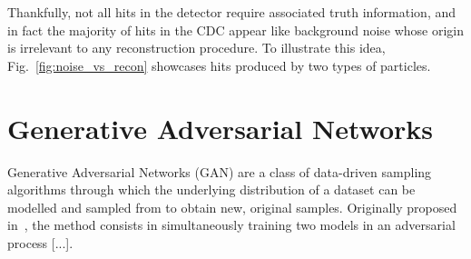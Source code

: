 Thankfully, not all hits in the detector require associated truth information, and in fact the majority of hits in the CDC appear like background noise whose origin is irrelevant to any reconstruction procedure. %
To illustrate this idea, Fig.~\ref{fig:noise_vs_recon} showcases hits produced by two types of particles.






\section{Generative Adversarial Networks} %
Generative Adversarial Networks (GAN) are a class of data-driven sampling algorithms through which the underlying distribution of a dataset can be modelled and sampled from to obtain new, original samples. %
Originally proposed in~\cite{goodfellow_generative_2014}, the method consists in simultaneously training two models in an adversarial process [...].











